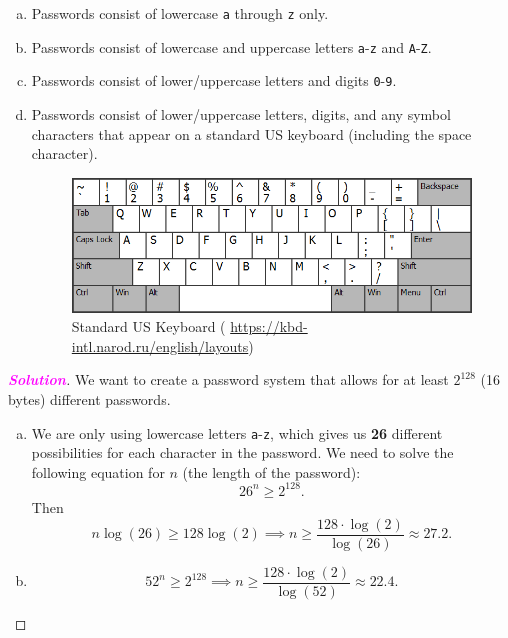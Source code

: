 \documentclass[12pt,openany]{book}
\theoremstyle{definition}
\newcommand{\sol}{\textcolor{magenta}{\bf Solution}}
\begin{document}
\begin{itemize}
		\begin{enumerate}[(a)]
			\item Passwords consist of lowercase \textcolor{red!70!black}{\texttt{a}} through \textcolor{red!70!black}{\texttt{z}} only.
			\item Passwords consist of lowercase and uppercase letters \textcolor{red!70!black}{\texttt{a}}-\textcolor{red!70!black}{\texttt{z}} and \textcolor{red!70!black}{\texttt{A}}-\textcolor{red!70!black}{\texttt{Z}}.
			\item Passwords consist of lower/uppercase letters and digits \textcolor{red!70!black}{\texttt{0}}-\textcolor{red!70!black}{\texttt{9}}.
			\item Passwords consist of lower/uppercase letters, digits, and any symbol characters that appear on a standard US keyboard (including the space character).\begin{figure}[h!]
				\centering
				\includegraphics[scale=.8]{us_std_keyboard.png}
				\caption{Standard US Keyboard ( \url{https://kbd-intl.narod.ru/english/layouts})}
			\end{figure}
		\end{enumerate}
			\begin{proof}[\sol]
				We want to create a password system that allows for at least \(2^{128}\) (16 bytes) different passwords.
				\begin{enumerate}[(a)]
					\item We are only using lowercase letters \textcolor{red!70!black}{\texttt{a}}-\textcolor{red!70!black}{\texttt{z}}, which gives us \textbf{26} different possibilities for each character in the password. We need to solve the following equation for 
					\(n\) (the length of the password): \[
					26^n\geq 2^{128}.
					\] Then \[
					n\log(26)\geq 128\log(2)\implies n\geq\frac{128\cdot\log(2)}{\log(26)}\approx 27.2.
					\]
					\item \[
					52^n\geq 2^{128}\implies
					n\geq\frac{128\cdot\log(2)}{\log(52)}\approx 22.4.
\]
\end{enumerate}
\end{proof}
\end{itemize}
\end{document}
